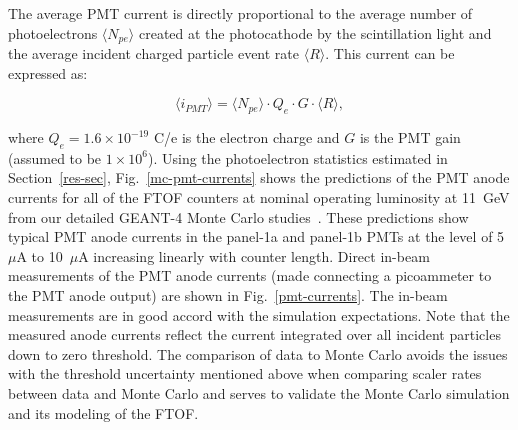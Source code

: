 \documentclass{elsart}
\begin{document}
The average PMT current is directly proportional to the average number of photoelectrons
$\langle N_{pe} \rangle$ created at the photocathode by the scintillation light and the average incident
charged particle event rate $\langle R \rangle$. This current can be expressed as:

\begin{equation}
\langle i_{PMT} \rangle = \langle N_{pe} \rangle \cdot Q_e \cdot G \cdot \langle R \rangle,
\end{equation}

\noindent
where $Q_e = 1.6 \times 10^{-19}$ C/e is the electron charge and $G$ is the PMT gain (assumed to
be $1 \times 10^6$). Using the photoelectron statistics estimated in Section~\ref{res-sec},
Fig.~\ref{mc-pmt-currents} shows the predictions of the PMT anode currents for all of the FTOF
counters at nominal operating luminosity at 11~GeV from our detailed GEANT-4 Monte Carlo
studies~\cite{gemc-cn2017}. These predictions show typical PMT anode currents in the panel-1a and
panel-1b PMTs at the level of 5~$\mu$A to 10~$\mu$A increasing linearly with counter length. Direct
in-beam measurements of the PMT anode currents (made connecting a picoammeter to the PMT anode
output) are shown in Fig.~\ref{pmt-currents}. The in-beam measurements are in good accord with the
simulation expectations. Note that the measured anode currents reflect the current integrated over
all incident particles down to zero threshold. The comparison of data to Monte Carlo avoids the issues
with the threshold uncertainty mentioned above when comparing scaler rates between data and Monte
Carlo and serves to validate the Monte Carlo simulation and its modeling of the FTOF.
\end{document}
